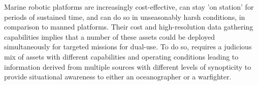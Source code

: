 Marine robotic platforms are increasingly cost-effective, can stay 'on
station' for periods of sustained time, and can do so in unseasonably
harsh conditions, in comparison to manned platforms. Their cost and
high-resolution data gathering capabilities implies that a number of
these assets could be deployed simultaneously for targeted missions
for dual-use. To do so, requires a judicious mix of assets with
different capabilities and operating conditions leading to information
derived from multiple sources with different levels of synopticity to
provide situational awareness to either an oceanographer or a
warfighter.

